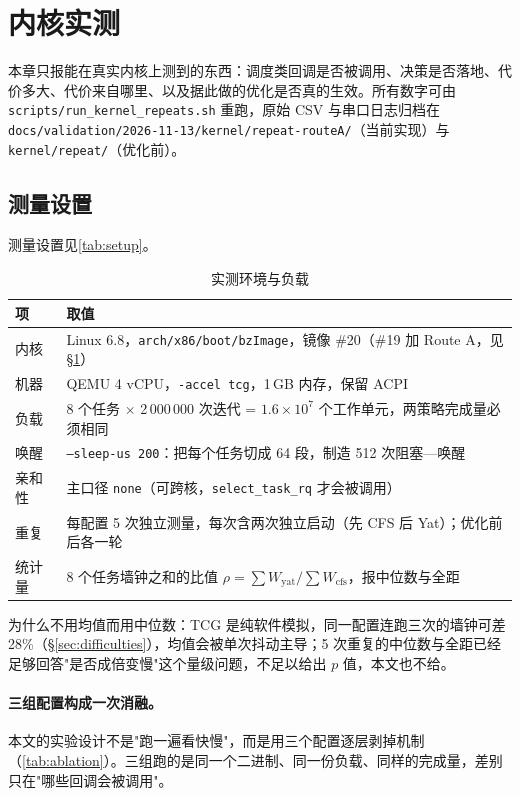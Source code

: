 
\section{内核实测} \label{sec:test}

本章只报能在真实内核上测到的东西：调度类回调是否被调用、决策是否落地、代价多大、代价来自哪里、以及据此做的优化是否真的生效。所有数字可由 \texttt{scripts/run\_kernel\_repeats.sh} 重跑，原始 CSV 与串口日志归档在 \texttt{docs/validation/2026-11-13/kernel/repeat-routeA/}（当前实现）与 \texttt{kernel/repeat/}（优化前）。

\subsection{测量设置}

测量设置见\autoref{tab:setup}。

\begin{table}[H]
\centering
\caption{实测环境与负载}
\label{tab:setup}
\small
\begin{tabular}{@{}p{3.0cm}p{10.0cm}@{}}
\toprule
项 & 取值 \\
\midrule
内核 & Linux 6.8，\texttt{arch/x86/boot/bzImage}，镜像 \#20（\#19 加 Route A，见 \S\ref{sec:test}） \\
机器 & QEMU 4 vCPU，\texttt{-accel tcg}，1\,GB 内存，保留 ACPI \\
负载 & 8 个任务 $\times$ 2\,000\,000 次迭代 = $1.6\times10^7$ 个工作单元，两策略完成量必须相同 \\
唤醒 & \texttt{--sleep-us 200}：把每个任务切成 64 段，制造 512 次阻塞—唤醒 \\
亲和性 & 主口径 \texttt{none}（可跨核，\texttt{select\_task\_rq} 才会被调用） \\
重复 & 每配置 5 次独立测量，每次含两次独立启动（先 CFS 后 Yat）；优化前后各一轮 \\
统计量 & 8 个任务墙钟之和的比值 $\rho=\sum W_{\text{yat}}/\sum W_{\text{cfs}}$，报中位数与全距 \\
\bottomrule
\end{tabular}
\end{table}

为什么不用均值而用中位数：TCG 是纯软件模拟，同一配置连跑三次的墙钟可差 28\%（\S\ref{sec:difficulties}），均值会被单次抖动主导；5 次重复的中位数与全距已经足够回答"是否成倍变慢"这个量级问题，不足以给出 $p$ 值，本文也不给。

\paragraph{三组配置构成一次消融。}本文的实验设计不是"跑一遍看快慢"，而是用三个配置逐层剥掉机制（\autoref{tab:ablation}）。三组跑的是同一个二进制、同一份负载、同样的完成量，差别只在"哪些回调会被调用"。

